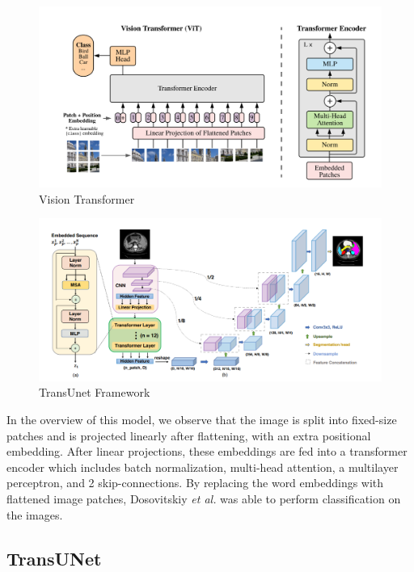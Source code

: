 \documentclass{IEEEtran}
\begin{document}
\begin{figure}[h]
    \centering
    \includegraphics[width=\textwidth]{img/ViT.png}
    \caption{Vision Transformer}\label{fig:vit}
\end{figure}

\begin{figure}[h]
    \centering
    \includegraphics[width=\textwidth]{img/transunet.png}
    \caption{TransUnet Framework}\label{fig:tunet}
\end{figure}

In the overview of this model, we observe that the image is split into fixed-size patches and is projected linearly after flattening, with an extra positional embedding. After linear projections, these embeddings are fed into a transformer encoder which includes batch normalization, multi-head attention, a multilayer perceptron, and 2 skip-connections. By replacing the word embeddings with flattened image patches, Dosovitskiy \textit{et al.} was able to perform classification on the images.   

\subsection{TransUNet}
\end{document}
